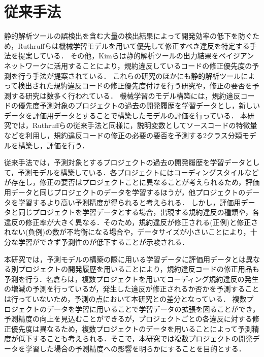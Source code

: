\documentclass[11pt,dvipdfmx]{jreport}
\begin{document}
\section{従来手法}

静的解析ツールの誤検出を含む大量の検出結果によって開発効率の低下を防ぐため，Ruthruffらは機械学習モデルを用いて優先して修正すべき違反を特定する手法を提案している\cite{JyuraiPre}．
その他，Kimらは静的解析ツールの出力結果をベイジアンネットワークに活用することにより，規約違反しているコードの修正優先度の予測を行う手法が提案されている\cite{beizu}．
これらの研究のほかにも静的解析ツールによって検出された規約違反コードの修正優先度付けを行う研究や，修正の要否を予測する研究は数多く行われている\cite{Wang}\cite{Qing}\cite{HowFar}．
機械学習のモデル構築には，規約違反コードの優先度予測対象のプロジェクトの過去の開発履歴を学習データとし，新しいデータを評価用データとすることで構築したモデルの評価を行っている．
本研究では，Ruthruffらの従来手法と同様に，説明変数としてソースコードの特徴量などを利用し，規約違反コードの修正の必要の要否を予測する2クラス分類モデルを構築し，評価を行う．

従来手法では，予測対象とするプロジェクトの過去の開発履歴を学習データとして，予測モデルを構築している．各プロジェクトにはコーディングスタイルなどが存在し，修正の要否はプロジェクトことに異なることが考えられるため，評価用データと同じプロジェクトのデータを学習するほうが，他プロジェクトのデータを学習するより高い予測精度が得られると考えられる．
しかし，評価用データと同じプロジェクトを学習データとする場合，出現する規約違反の種類や，各違反の修正率が大きく異なる\cite{Panichella}．そのため，規約違反が修正される(正例)と修正されない(負例)の数が不均衡になる場合や，データサイズが小さいことにより，十分な学習ができず予測性のが低下することが示唆される．

本研究では，予測モデルの構築の際に用いる学習データに評価用データとは異なる別プロジェクトの開発履歴を用いることにより，規約違反コードの修正用品も予測を行う．名倉らは，複数プロジェクトを用いてコーディング規約違反の発生の増減の予測を行っているが，発生した違反が修正されるか否かを予測することは行っていないため，予測の点において本研究との差分となっている\cite{nagura}．
複数プロジェクトのデータを学習に用いることで学習データの拡張を図ることができ，予測精度の向上を見込むことができるが，プロジェクトごとの各違反に対する修正優先度は異なるため，複数プロジェクトのデータを用いることによって予測精度が低下することも考えられる．そこで，本研究では複数プロジェクトの開発データを学習した場合の予測精度への影響を明らかにすることを目的とする．
\end{document}
